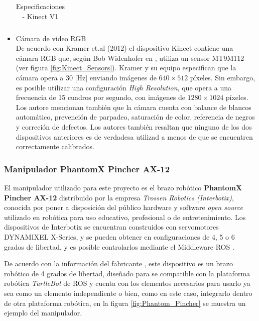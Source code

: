 \begin{itemize}
\begin{table}
\begin{tabular}{|c|c|}
                \hline
                \end{tabular}
                \caption{Especificaciones - Kinect V1}
                \label{tab:Kinect_especs}
            \end{table}

            \item Cámara de video RGB \\
            De acuerdo con Kramer et.al (2012) \cite{kramer_hacking_2012} el dispositivo Kinect contiene una cámara RGB que, según Bob Widenhofer en \cite{eetimes_inside_2010}, utiliza un sensor MT9M112 (ver figura \ref{fig:Kinect_Sensors}). Kramer y su equipo especifican que la cámara opera a 30 [Hz] enviando imágenes de $640\times512$ píxeles. Sin embargo, es posible utilizar una configuración \textit{High Resolution}, que opera a una frecuencia de 15 cuadros por segundo, con imágenes de $1280\times1024$ píxeles. Los autore mencionan también que la cámara cuenta con balance de blancos automático, prevención de parpadeo, saturación de color, referencia de negros y correción de defectos. Los autores también resaltan que ninguno de los dos dispositivos anteriores es de verdadesa utilizad a menos de que se encuentren correctamente calibrados. 
            \end{itemize}
            
            \subsubsection{Manipulador PhantomX Pincher AX-12}
            El manipulador utilizado para este proyecto es el brazo robótico \textbf{PhantomX Pincher AX-12} distribuido por la empresa \textit{Trossen Robotics (Interbotix)}, conocida por poner a disposición del público hardware y software \textit{open source} utilizado en robótica para uso educativo, profesional o de entretenimiento. Los dispositivos de Interbotix se encuentran construidos con servomotores DYNAMIXEL X-Series, y se pueden obtener en configuraciones de 4, 5 o 6 grados de libertad, y es posible controlarlos mediante el Middleware ROS \cite{Interbotix_interbotix}. 
            
            De acuerdo con la información del fabricante \cite{Interbotix_widowx_PincherArm}, este dispositivo es un brazo robótico de 4 grados de libertad, diseñado para se compatible con la plataforma robótica \textit{TurtleBot} de ROS y cuenta con los elementos necesarios para usarlo ya sea como un elemento independiente o bien, como en este caso, integrarlo dentro de otra plataforma robótica, en la figura \ref{fig:Phantom_Pincher} se muestra un ejemplo del manipulador.\newpage
            
